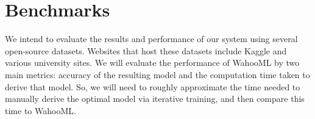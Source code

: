 \documentclass[../proposal.tex]{subfiles}
\begin{document}
\section{Benchmarks}

We intend to evaluate the results and performance of our system using
several open-source datasets. Websites that host these datasets include
Kaggle and various university sites. We will evaluate the performance
of WahooML by two main metrics: accuracy of the resulting model and
the computation time taken to derive that model. So, we will need to
roughly approximate the time needed to manually derive the optimal model
via iterative training, and then compare this time to WahooML.
\end{document}
